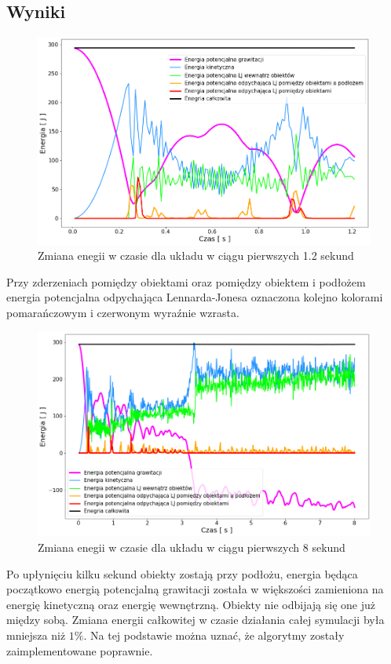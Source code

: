 \documentclass[12pt, letterpaper]{report}
\begin{document}
    \pagebreak
    \subsection{Wyniki}
    \begin{figure}[h]
        \centering
        \includegraphics[width=13cm]{energy_test_0to2s}
        \caption{Zmiana enegii w czasie dla układu w ciągu pierwszych 1.2 sekund}
    \end{figure}

    Przy zderzeniach pomiędzy obiektami oraz pomiędzy obiektem i podłożem energia potencjalna
    odpychająca Lennarda-Jonesa oznaczona kolejno kolorami pomarańczowym i czerwonym
    wyraźnie wzrasta.
    \begin{figure}[h]
        \centering
        \includegraphics[width=13cm]{energy_test_0to8s}
        \caption{Zmiana enegii w czasie dla układu w ciągu pierwszych 8 sekund}
    \end{figure}
    
    Po upłynięciu kilku sekund obiekty zostają przy podłożu, energia będąca początkowo energią
    potencjalną grawitacji została w większości zamieniona na energię kinetyczną oraz energię
    wewnętrzną. Obiekty nie odbijają się one już między sobą.
    Zmiana energii całkowitej w czasie działania całej symulacji była mniejsza niż $1\%$. Na tej
    podstawie można uznać, że algorytmy zostały zaimplementowane poprawnie.
\end{document}

